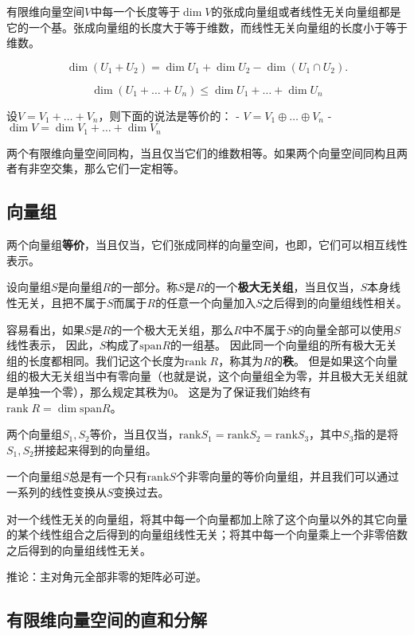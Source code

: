 有限维向量空间$V$中每一个长度等于$\dim V$的张成向量组或者线性无关向量组都是它的一个基。张成向量组的长度大于等于维数，而线性无关向量组的长度小于等于维数。

\[
\dim (U_1 + U_2) = \dim U_1 + \dim U_2 - \dim (U_1 \cap U_2).
\]

\[
\dim (U_1 + \ldots + U_n) \leq \dim U_1 + \ldots + \dim U_n
\]

设$V=V_1 + \ldots + V_n$，则下面的说法是等价的： -
$V = V_1 \oplus \ldots \oplus V_n$ -
$\dim V = \dim V_1 + \ldots + \dim V_n$

两个有限维向量空间同构，当且仅当它们的维数相等。如果两个向量空间同构且两者有非空交集，那么它们一定相等。

\hypertarget{ux5411ux91cfux7ec4}{%
\subsection{向量组}\label{ux5411ux91cfux7ec4}}

两个向量组\textbf{等价}，当且仅当，它们张成同样的向量空间，也即，它们可以相互线性表示。

设向量组$S$是向量组$R$的一部分。称$S$是$R$的一个\textbf{极大无关组}，当且仅当，$S$本身线性无关，且把不属于$S$而属于$R$的任意一个向量加入$S$之后得到的向量组线性相关。

容易看出，如果$S$是$R$的一个极大无关组，那么$R$中不属于$S$的向量全部可以使用$S$线性表示，
因此，$S$构成了$\mathrm{span} R$的一组基。
因此同一个向量组的所有极大无关组的长度都相同。我们记这个长度为$\mathrm{rank}\; R$，称其为$R$的\textbf{秩}。
但是如果这个向量组的极大无关组当中有零向量（也就是说，这个向量组全为零，并且极大无关组就是单独一个零），那么规定其秩为0。
这是为了保证我们始终有$\mathrm{rank} \; R = \dim \mathrm{span} R$。

两个向量组$S_1, S_2$等价，当且仅当，$\mathrm{rank}S_1 = \mathrm{rank}S_2 = \mathrm{rank}S_3$，其中$S_3$指的是将$S_1, S_2$拼接起来得到的向量组。

一个向量组$S$总是有一个只有$\mathrm{rank}S$个非零向量的等价向量组，并且我们可以通过一系列的线性变换从$S$变换过去。

对一个线性无关的向量组，将其中每一个向量都加上除了这个向量以外的其它向量的某个线性组合之后得到的向量组线性无关；将其中每一个向量乘上一个非零倍数之后得到的向量组线性无关。

推论：主对角元全部非零的矩阵必可逆。

\hypertarget{ux6709ux9650ux7ef4ux5411ux91cfux7a7aux95f4ux7684ux76f4ux548cux5206ux89e3}{%
\subsection{有限维向量空间的直和分解}\label{ux6709ux9650ux7ef4ux5411ux91cfux7a7aux95f4ux7684ux76f4ux548cux5206ux89e3}}

